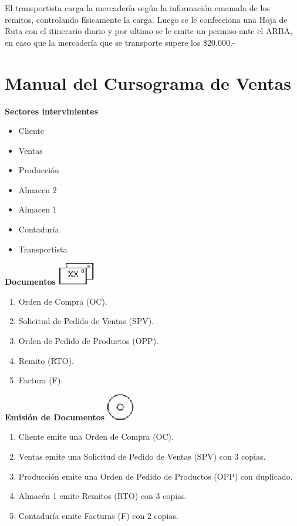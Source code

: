 \begin{description}
	El transportista carga la mercader\'ia seg\'un la informaci\'on emanada de los remitos, controlando f\'isicamente la carga.  Luego se le confecciona una Hoja de Ruta con el itinerario diario y por ultimo se le emite un permiso ante el ARBA, en caso que la mercader\'ia que se transporte supere los \$20.000.-   
\end{description}

\pagebreak
\section{Manual del Cursograma de Ventas}

\begin{center}\textbf{Sectores intervinientes}\end{center}
\begin{itemize}
  \item Cliente
  \item Ventas
  \item Producci\'on
  \item Almacen 2
  \item Almacen 1
  \item Contadur\'ia
  \item Transportista
\end{itemize}

\begin{center}
  \textbf{Documentos}
  \includegraphics{./Images/Simbolos/simbolo-Documentos.png}
\end{center}
\begin{enumerate}
  \item Orden de Compra (OC).
  \item Solicitud de Pedido de Ventas (SPV).
  \item Orden de Pedido de Productos (OPP).
  \item Remito (RTO).
  \item Factura (F).
\end{enumerate}

\begin{center}
  \textbf{Emisi\'on de Documentos}
  \includegraphics{./Images/Simbolos/simbolo-Emision-de-Documentos.png}
\end{center}
\begin{enumerate}
  \item Cliente emite una Orden de Compra (OC).
  \item Ventas emite una Solicitud de Pedido de Ventas (SPV) con 3 copias. 
  \item Producci\'on emite una Orden de Pedido de Productos (OPP) con duplicado.
  \item Almac\'en 1 emite Remitos (RTO) con 3 copias.
  \item Contadur\'ia emite Facturas (F) con 2 copias.
\end{enumerate}

